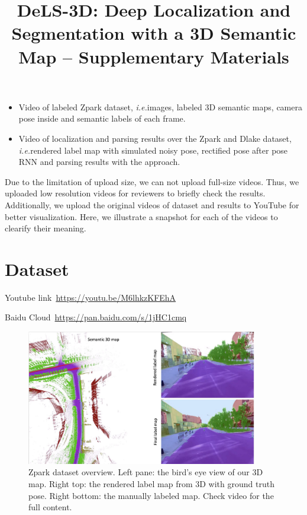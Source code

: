 \documentclass[10pt,twocolumn,letterpaper]{article}
\def\ie{\emph{i.e.}}
\begin{document}
\onecolumn
\title{DeLS-3D: Deep Localization and Segmentation with a 3D Semantic Map -- Supplementary Materials}
\maketitle

\begin{itemize}
\vspace{-0.5\baselineskip}
    \setlength{\itemsep}{-2pt}
    \item Video of labeled Zpark dataset, \ie images, labeled 3D semantic maps, camera pose inside and semantic labels of each frame.
    \item Video of localization and parsing results over the Zpark and Dlake dataset, \ie rendered label map with simulated noisy pose, rectified pose after pose RNN and parsing results with the approach.
\vspace{-0.4\baselineskip}
\end{itemize}

Due to the limitation of upload size, we can not upload full-size videos. Thus, we uploaded low resolution videos for reviewers to briefly check the results. 
Additionally, we upload the original videos of dataset and results to YouTube for better visualization. Here, we illustrate a snapshot for each of the videos to clearify their meaning.

\section{Dataset} 
Youtube link~\url{https://youtu.be/M6lhkzKFEhA}

Baidu Cloud~\url{https://pan.baidu.com/s/1jHC1cmq}

\begin{figure}[!hbpt]
\center
\includegraphics[width=0.9\textwidth]{fig/dataset_video.pdf}
\caption{Zpark dataset overview. Left pane: the bird's eye view of our 3D map. Right top: the rendered label map from 3D with ground truth pose. Right bottom: the manually labeled map. Check video for the full content.}
\label{fig:framework}
\end{figure}
\end{document}
